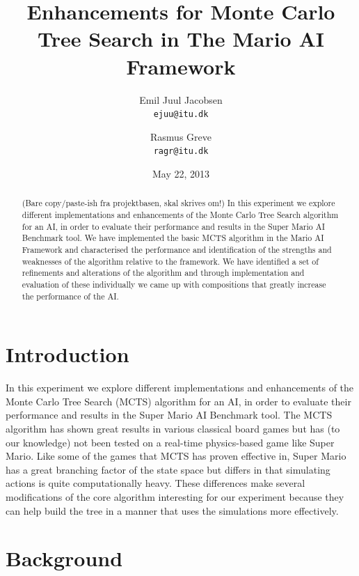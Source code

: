 \documentclass[10pt,a4paper]{article}
\begin{document}
\title{Enhancements for Monte Carlo Tree Search in The Mario AI Framework}
\date{May 22, 2013}
\author{Emil Juul Jacobsen\\\texttt{ejuu@itu.dk}        
        \and Rasmus Greve\\\texttt{ragr@itu.dk}}
\maketitle
\thispagestyle{empty} %

\begin{abstract}
(Bare copy/paste-ish fra projektbasen, skal skrives om!) %
In this experiment we explore different implementations and enhancements of the Monte Carlo Tree Search algorithm for an AI, in order to evaluate their performance and results in the Super Mario AI Benchmark tool. 
We have implemented the basic MCTS algorithm in the Mario AI 
Framework and characterised the performance and identification of 
the strengths and weaknesses of the algorithm relative to the 
framework. We have identified a set of refinements and alterations of the algorithm 
and through implementation and evaluation of these individually we came up
with compositions that greatly increase the performance of the AI.
\end{abstract}
\clearpage

\section{Introduction}
In this experiment we explore different implementations and enhancements of the Monte Carlo Tree Search (MCTS) algorithm for an AI, in order to evaluate their performance and results in the Super Mario AI Benchmark tool. The MCTS algorithm has shown great results in various classical board games but has (to our knowledge) not been tested on a real-time physics-based game like Super Mario. Like some of the games that MCTS has proven effective in, Super Mario has a great branching factor of the state space but differs in that simulating actions is quite computationally heavy. These differences make several modifications of the core algorithm interesting for our experiment because they can help build the tree in a manner that uses the simulations more effectively. %
\clearpage

\section{Background}
\end{document}
